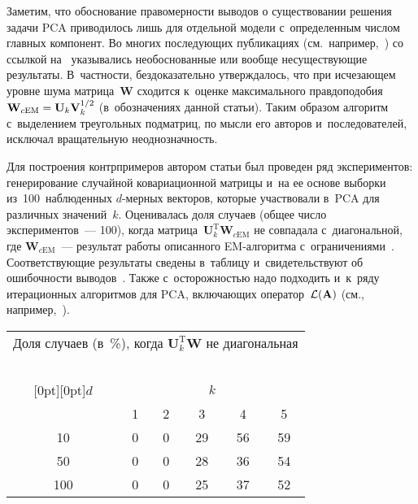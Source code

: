 \begin{multicols}{2}
     Заметим, что обоснование правомерности выводов о существовании 
решения задачи PCA приводилось лишь для отдельной модели с~определенным 
числом главных компонент. Во многих по\-сле\-ду\-ющих публикациях (см.\ 
например,~\cite{7-kri}) со ссылкой на~\cite{6-kri} указывались необоснованные 
или вообще несуществующие результаты. В~частности, бездоказательно 
утверждалось, что при ис\-че\-за\-ющем уровне шума матрица~$\mathbf{W}$ 
сходится к~оценке максимального правдоподобия $\mathbf{W}_{c\mathrm{EM}} \hm= 
\mathbf{U}_k \mathbf{V}_k^{1/2}$ (в~обозначениях данной статьи). Таким 
образом алгоритм с~выделением треугольных подматриц, по мысли его авторов 
и~последователей, исключал вращательную неоднозначность. 
     
     Для построения контрпримеров автором статьи был проведен ряд 
экспериментов: генерирование случайной ковариационной матрицы и~на ее 
основе выборки из~100~наблюденных $d$-мер\-ных векторов, которые 
участвовали в~PCA для различных значений~$k$. Оценивалась доля случаев 
(общее число экспериментов~--- 100), когда 
матрица~$\mathbf{U}_k^{\mathrm{T}} \mathbf{W}_{c\mathrm{EM}}$ не совпадала 
с~диагональной, где $\mathbf{W}_{c\mathrm{EM}}$~--- результат работы описанного 
EM-ал\-го\-рит\-ма с~ограничениями~\cite{6-kri}. Соответствующие результаты 
сведены в~таблицу и~свидетельствуют об ошибочности  
выводов~\cite{6-kri, 7-kri}. Также с~осторожностью надо подходить и~к~ряду 
итерационных алгоритмов для PCA, включающих 
оператор~$\cal{L}(\mathbf{A})$ (см., например,~\cite{8-kri}). 
     
     {\small
     \vspace*{6pt}
     \begin{center}
     \begin{tabular}{|c|c|c|c|c|c|}
     \multicolumn{6}{p{40mm}}{Доля случаев (в~\%), когда $\mathbf{U}_k^{\mathrm{T}}\mathbf{W}$  не диагональная}\\
     \multicolumn{6}{c}{\ }\\[-6pt]
     \hline
     \multicolumn{1}{|c|}{\raisebox{-6pt}[0pt][0pt]{$d$}}&\multicolumn{5}{c|}{$k$}\\
     \cline{2-6}
     & 1&2&3&4&5\\
     \hline
10&0&0&29&56&59\\
50&0&0&28&36&54\\
100\hphantom{9}&0&0&25&37&52\\
\hline
\end{tabular}
\end{center}}
     

\end{multicols}
